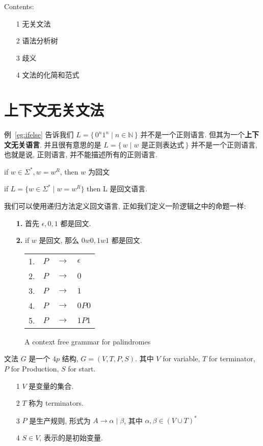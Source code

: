 \documentclass[../main_part1.tex]{subfiles}
\begin{document}
Contents: 
\begin{itemize}
\item [1] 无关文法 
\item [2] 语法分析树
\item [3]  歧义
\item [4] 文法的化简和范式
\end{itemize}

\section{上下文无关文法}\label{sec:def}
\noindent 例~\ref{eg:ifelse} 告诉我们 \(L = \{ \, 0^{n}1^{n}\mid n \in \mathbb{N} \, \}\) 并不是一个正则语言. 但其为一个\textbf{上下文无关语言}. 并且很有意思的是 \(L = \{ \,  w \mid w \text{ 是正则表达式} \, \}\) 并不是一个正则语言, 也就是说, 正则语言, 并不能描述所有的正则语言.



\begin{exam}[回文]
if \(w \in \Sigma ^{*} , w = w ^{R}\), then \(w\) 为回文
\end{exam}
\begin{exam}[回文语言]
	if \( L =  \{ w \in \Sigma ^{* } \mid w = w ^{R} \}\)
	then L 是回文语言. 
\end{exam}
我们可以使用递归方法定义回文语言, 正如我们定义一阶逻辑之中的命题一样: 
\begin{itemize}
\item [\textbf{1.}] 首先 \(\epsilon, 0 , 1\) 都是回文.
\item [\textbf{2.}] if \(w\) 是回文, 那么 \( 0  w 0 , 1 w 1 \) 都是回文. 
\end{itemize}

\begin{figure}
	\centering
	\begin{tabular}{cccl}
		1. & \(P \) & \(\to\) & \(\epsilon\) \\ 
		2. & \(P\) & \(\to\) & \(0\)\\
		3. & \(P\) & \(\to\) & \(1\)\\
		4. & \(P\) & \(\to\) & \(0P0\)\\
		5. & \(P\) & \(\to\) & \(1P1\)\\
	\end{tabular}
	\caption{A context free grammar for palindromes}
\end{figure}

\begin{definition}[文法]
	文法 \(G\) 是一个 \(4p\) 结构, \(G = (V , T , P , S ) \).
	其中 \(V \) for variable, \(T\) for terminator, \(P\) for Production, \(S\) for start.
	\begin{itemize}
	\item [1]  \(V\) 是变量的集合. 
	\item [2]  \(T\) 称为 terminators. 
	\item [3]  \(P\) 是生产规则, 形式为 \(A \to\alpha \mid\beta\), 其中 \(\alpha ,\beta \in (V \cup T ) ^{*}\) 
	\item [4]  \( S \in V\), 表示的是初始变量.
	\end{itemize}
\end{definition}
\end{document}
